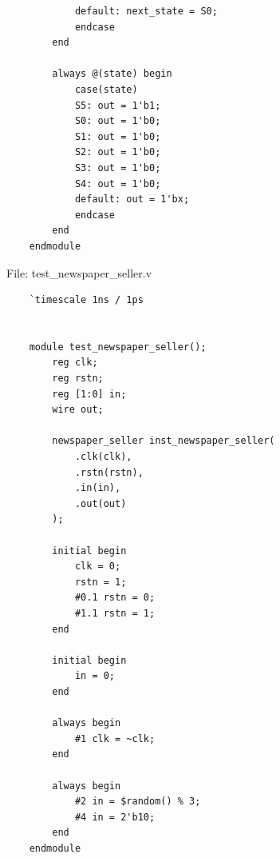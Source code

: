 \documentclass{article}
\begin{document}
\begin{lstlisting}
            default: next_state = S0;
            endcase
        end
    
        always @(state) begin
            case(state)
            S5: out = 1'b1;
            S0: out = 1'b0;
            S1: out = 1'b0;
            S2: out = 1'b0;
            S3: out = 1'b0;
            S4: out = 1'b0;
            default: out = 1'bx;
            endcase
        end
    endmodule    
\end{lstlisting}

File: test\_newspaper\_seller.v
\begin{lstlisting}
    `timescale 1ns / 1ps


    module test_newspaper_seller();
        reg clk;
        reg rstn;
        reg [1:0] in;
        wire out;
    
        newspaper_seller inst_newspaper_seller(
            .clk(clk),
            .rstn(rstn),
            .in(in),
            .out(out)
        );
    
        initial begin
            clk = 0;
            rstn = 1;
            #0.1 rstn = 0;
            #1.1 rstn = 1;
        end
    
        initial begin
            in = 0;
        end
    
        always begin
            #1 clk = ~clk;
        end
    
        always begin
            #2 in = $random() % 3;
            #4 in = 2'b10;
        end
    endmodule    
\end{lstlisting}
\end{document}
